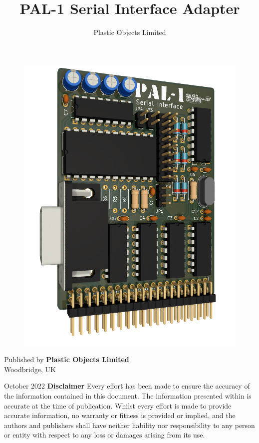 \documentclass[a4paper,11pt,twoside,openright]{report}
\title{PAL-1 Serial Interface Adapter}
\author{Plastic Objects Limited}
\date{}
\newcommand\frontmatter{
  \cleardoublepage
  \pagenumbering{roman}}
\begin{document}
\frontmatter
\begin{titlepage}
\begin{figure}[t]
\centering
\includegraphics[scale=0.25]{figures/serial.png}
\end{figure}
\maketitle			
\end{titlepage}
\clearpage
\noindent Published by \textbf{Plastic Objects Limited} \\
Woodbridge, UK

\bigskip
\noindent October 2022
\vfill
{\noindent\Large\textbf{Disclaimer}}
\vskip 6pt
Every effort has been made to ensure the accuracy of the information contained in this document. The information presented within is accurate at the time of publication. Whilst every effort is made to provide accurate information, no warranty or fitness is provided or implied, and the authors and publishers shall have neither liability nor responsibility to any person or entity with respect to any loss or damages arising from its use.
\end{document}
